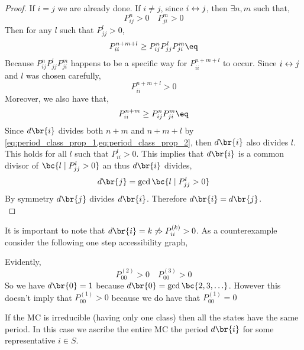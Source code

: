 \documentclass{article}
\begin{document}
\begin{proof}
If $i = j$ we are already done. If $i \neq j$, since ${i}\leftrightarrow{j}$, then $\exists n, m$ such that,
\[ P_{ij}^{n} > 0 \quad P_{ji}^{m} > 0 \]
Then for any $l$ such that $P^{l}_{jj} > 0$,
\[ P_{ii}^{n+m+l} \geq P_{ij}^{n}P_{jj}^{l}P_{ji}^{m} \eq \label{eq:period_class_prop_2} \]
Because $P_{ij}^{n}P_{jj}^{l}P_{ji}^{m}$ happens to be a specific way for $P_{ii}^{n+m+l}$ to occur. Since ${i}\leftrightarrow{j}$ and $l$ was chosen carefully,
\[ P_{ii}^{n+m+l} > 0 \]
Moreover, we also have that,
\[ P_{ii}^{n+m} \geq P_{ij}^{n}P_{ji}^{m} \eq \label{eq:period_class_prop_1}\]
Since $d\br{i}$ divides both $n+m$ and $n+m+l$ by \cref{eq:period_class_prop_1,eq:period_class_prop_2}, then $d\br{i}$ also divides $l$. This holds for all $l$ such that $P_{ii}^{l}>0$. This implies that $d\br{i}$ is a common divisor of $\bc{l \mid P_{jj}^{l} > 0}$ an thus $d\br{i}$ divides,
\[ d\br{j} = \gcd \bc{l \mid P_{jj}^{l} > 0} \]
By symmetry $d\br{j}$ divides $d\br{i}$. Therefore $d\br{i} = d\br{j}$. \\
\end{proof}

\begin{remark}
It is important to note that $d\br{i} = k \not\Rightarrow P_{ii}^{(k)} > 0$. As a counterexample consider the following one step accessibility graph,
\begin{center}
\end{center}
Evidently,
\[ P^{(2)}_{00} > 0 \quad P^{(3)}_{00} > 0 \]
So we have $d\br{0} = 1$ because $d\br{0} = \gcd\bc{2,3,\ldots}$. However this doesn't imply that $P_{00}^{(1)} > 0$ because we do have that $P^{(1)}_{00} = 0$
\end{remark}

\begin{remark}
If the MC is irreducible (having only one class) then all the states have the same period. In this case we ascribe the entire MC the period $d\br{i}$ for some representative $ i \in S$.
\end{remark}
\end{document}
